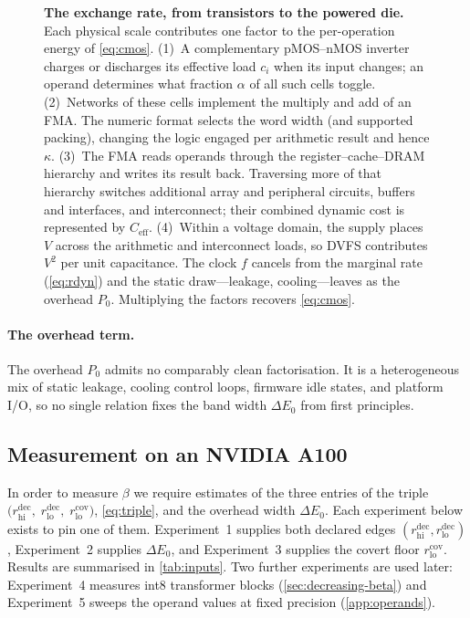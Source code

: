 \documentclass{article}
\theoremstyle{plain}
\theoremstyle{definition}
\theoremstyle{remark}
\begin{document}
\begin{figure}[t]
{\begin{tikzpicture}
	\end{tikzpicture}%
	}
	\caption{\textbf{The exchange rate, from transistors to the powered die.}
		Each physical scale contributes one factor to the per-operation energy of
		\cref{eq:cmos}. (1)~A complementary pMOS--nMOS inverter charges or discharges
		its effective load \(c_i\) when its input changes; an operand determines
		what fraction \(\alpha\) of all such cells toggle. (2)~Networks of these
		cells implement the multiply and add of an FMA. The numeric format selects
		the word width (and supported packing), changing the logic engaged per
		arithmetic result and hence \(\kappa\). (3)~The FMA reads operands through
		the register--cache--DRAM hierarchy and writes its result back. Traversing
		more of that hierarchy switches additional array and peripheral circuits,
		buffers and interfaces, and interconnect; their combined dynamic cost is
		represented by \(C_{\mathrm{eff}}\). (4)~Within a voltage domain, the supply places
		\(V\) across the arithmetic and interconnect loads, so DVFS contributes
		\(V^2\) per unit capacitance. The
		clock \(f\) cancels from the marginal rate (\cref{eq:rdyn}) and the static
		draw---leakage, cooling---leaves as the overhead \(P_0\).
		Multiplying the factors recovers \cref{eq:cmos}.}
	\label{fig:exchange-scales}
\end{figure}

\paragraph{The overhead term.}
The overhead $P_0$ admits no comparably
clean factorisation. It is a
heterogeneous mix of static leakage, cooling control loops, firmware idle states,
and platform I/O, so no single relation fixes the band width $\Delta E_0$ from
first principles.

\subsection{Measurement on an NVIDIA A100}
\label{sec:empirical-measurements}
In order to measure $\beta$ we require estimates of the three entries of the triple $	\bigl(r_{\mathrm{hi}}^{\mathrm{dec}},\;r_{\mathrm{lo}}^{\mathrm{dec}},\;
	r_{\mathrm{lo}}^{\mathrm{cov}}\bigr)$, 
\cref{eq:triple}, and the overhead width $\Delta E_0$. Each experiment below
exists to pin one of them. Experiment~1 supplies both declared edges
$(r_{\mathrm{hi}}^{\mathrm{dec}}, r_{\mathrm{lo}}^{\mathrm{dec}})$,
Experiment~2 supplies $\Delta E_0$, and Experiment~3 supplies the covert floor
$r_{\mathrm{lo}}^{\mathrm{cov}}$. Results are summarised in \cref{tab:inputs}. Two further
experiments are used later: Experiment~4 measures int8 transformer blocks
(\cref{sec:decreasing-beta}) and Experiment~5 sweeps the operand values at
fixed precision (\cref{app:operands}).
\end{document}

